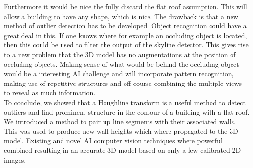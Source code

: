 \documentclass[10pt]{article}
\begin{document}
Furthermore it would be nice the fully discard the flat roof assumption. This will allow a building to have any shape, which is nice. The drawback is that a new method of outlier detection has to be developed. Object recognition could have a great deal in this. If one knows where for example an occluding object is located, then this could be used to filter the output of the skyline detector. This gives rise to a new problem that the 3D model has no augmentations at the position of occluding objects. Making sense of what would be behind the occluding object would be a interesting AI challenge and will incorporate pattern recognition, making use of repetitive structures and off course combining the multiple views to reveal as much information.\\

To conclude, we showed that a Houghline transform is a useful method to detect outliers and find prominent structure in the contour of a building with a flat roof. We introduced a method to pair up line segments with their associated walls. This was used to produce new wall heights which where propagated to the 3D model.
Existing and novel AI computer vision techniques where powerful combined resulting in an accurate 3D model based on only a few calibrated 2D images. 


\end{document}
